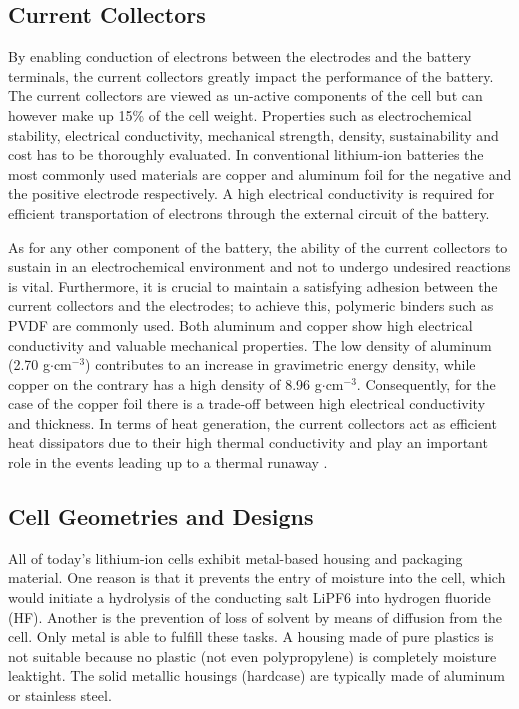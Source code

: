 \subsection{Current Collectors}
\label{sec:current-collectors}
By enabling conduction of electrons between the electrodes and the battery terminals, the current collectors greatly impact the performance of the battery. The current collectors are viewed as un-active components of the cell but can however make up 15\% of the cell weight. Properties such as electrochemical stability, electrical conductivity, mechanical strength, density, sustainability and cost has to be thoroughly evaluated. In conventional lithium-ion batteries the most commonly used materials are copper and aluminum foil for the negative and the positive electrode respectively. A high electrical conductivity is required for efficient transportation of electrons through the external circuit of the battery. 

As for any other component of the battery, the ability of the current collectors to sustain in an electrochemical environment and not to undergo undesired reactions is vital. Furthermore, it is crucial to maintain a satisfying adhesion between the current collectors and the electrodes; to achieve this, polymeric binders such as PVDF are commonly used. Both aluminum and copper show high electrical conductivity and valuable mechanical properties. The low density of aluminum (2.70 g$\cdot$cm$^{-3}$) contributes to an increase in gravimetric energy density, while copper on the contrary has a high density of 8.96 g$\cdot$cm$^{-3}$. Consequently, for the case of the copper foil there is a trade-off between high electrical conductivity and thickness. In terms of heat generation, the current collectors act as efficient heat dissipators due to their high thermal conductivity and play an important role in the events leading up to a thermal runaway \cite{zhu2021review}.

\subsection{Cell Geometries and Designs}
\label{sec:cell-geometries-designs}
All of today’s lithium-ion cells exhibit metal-based housing and packaging material. One reason is that it prevents the entry of moisture into the cell, which would initiate a hydrolysis of the conducting salt LiPF6 into hydrogen fluoride (HF). Another is the prevention of loss of solvent by means of diffusion from the cell. Only metal is able to fulfill these tasks. A housing made of pure plastics is not suitable because no plastic (not even polypropylene) is completely moisture leaktight. The solid metallic housings (hardcase) are typically made of aluminum or stainless steel.

